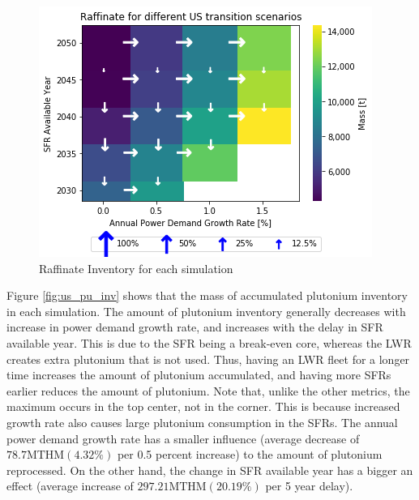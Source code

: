 \begin{figure}[htbp!]
    \begin{center}
        \includegraphics[scale=0.7]{./images/us/scat_both_Raffinate.png}
    \end{center}
        \caption{Raffinate Inventory for each simulation}
    \label{fig:us_raff}
\end{figure}

Figure \ref{fig:us_pu_inv} shows that the mass of accumulated
plutonium inventory in each simulation. 
The amount of plutonium inventory generally decreases with increase
in power demand growth rate, and increases with the delay in
\gls{SFR} available year. This is due to the \gls{SFR} being a
break-even core, whereas the \gls{LWR} creates extra plutonium
that is not used. Thus, having an \gls{LWR} fleet for a longer
time increases the amount of plutonium accumulated, and having
more \glspl{SFR} earlier reduces the amount of plutonium. 
Note that, unlike the other metrics, the maximum occurs in
the top center, not in the corner. This is because increased growth rate
also causes large plutonium consumption in the \glspl{SFR}. The annual power demand
growth rate has a smaller influence (average decrease of $78.7 \text{MTHM} (4.32 \%)$ 
per 0.5 percent increase) to the amount of plutonium
reprocessed. On the other hand, the change in  \gls{SFR} available year
has a bigger an effect (average increase of $297.21 \text{MTHM} (20.19\%)$
per 5 year delay).


